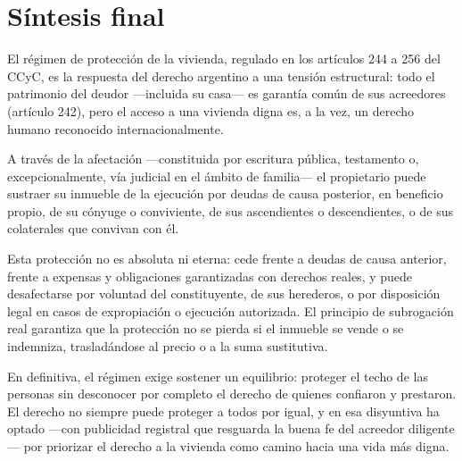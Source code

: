 \documentclass[12pt,oneside]{book}
\begin{document}
\chapter[S\'intesis final]{S\'intesis final}

El r\'egimen de protecci\'on de la vivienda, regulado en los art\'iculos 244 a 256 del CCyC, es la respuesta del derecho argentino a una tensi\'on estructural: todo el patrimonio del deudor ---incluida su casa--- es garant\'ia com\'un de sus acreedores (art\'iculo 242), pero el acceso a una vivienda digna es, a la vez, un derecho humano reconocido internacionalmente.

A trav\'es de la afectaci\'on ---constituida por escritura p\'ublica, testamento o, excepcionalmente, v\'ia judicial en el \'ambito de familia--- el propietario puede sustraer su inmueble de la ejecuci\'on por deudas de causa posterior, en beneficio propio, de su c\'onyuge o conviviente, de sus ascendientes o descendientes, o de sus colaterales que convivan con \'el.

Esta protecci\'on no es absoluta ni eterna: cede frente a deudas de causa anterior, frente a expensas y obligaciones garantizadas con derechos reales, y puede desafectarse por voluntad del constituyente, de sus herederos, o por disposici\'on legal en casos de expropiaci\'on o ejecuci\'on autorizada. El principio de subrogaci\'on real garantiza que la protecci\'on no se pierda si el inmueble se vende o se indemniza, traslad\'andose al precio o a la suma sustitutiva.

En definitiva, el r\'egimen exige sostener un equilibrio: proteger el techo de las personas sin desconocer por completo el derecho de quienes confiaron y prestaron. El derecho no siempre puede proteger a todos por igual, y en esa disyuntiva ha optado ---con publicidad registral que resguarda la buena fe del acreedor diligente--- por priorizar el derecho a la vivienda como camino hacia una vida m\'as digna.
\end{document}
